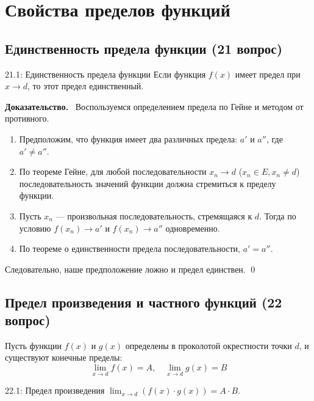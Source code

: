 \documentclass[a4paper,12pt]{article}
\newcommand{\myproof}{\textbf{Доказательство.}\ }
\begin{document}
	
	
	
	
	
	
	
	
	\newpage
	\section{Свойства пределов функций}
	
	\subsection{Единственность предела функции (21 вопрос)}
	
	\begin{theorembox}{21.1: Единственность предела функции}
		Если функция $f(x)$ имеет предел при $x \to d$, то этот предел единственный.
	\end{theorembox}
	\vspace{0.5cm}
	\myproof
	Воспользуемся определением предела по Гейне и методом от противного.
	\begin{enumerate}
		\item Предположим, что функция имеет два различных предела: $a'$ и $a''$, где $a' \neq a''$.
		\item По теореме Гейне, для любой последовательности $x_n \to d$ ($x_n \in E, x_n \neq d$) последовательность значений функции должна стремиться к пределу функции.
		\item Пусть $x_n$ — произвольная последовательность, стремящаяся к $d$. Тогда по условию $f(x_n) \to a'$ и $f(x_n) \to a''$ одновременно.
		\item По теореме о единственности предела последовательности, $a' = a''$.
	\end{enumerate}
	Следовательно, наше предположение ложно и предел единствен. \qed
	
		
	
	\vspace{1cm}
	\subsection{Предел произведения и частного функций (22 вопрос)}
	
	Пусть функции $f(x)$ и $g(x)$ определены в проколотой окрестности точки $d$, и существуют конечные пределы:
	\[ \lim_{x \to d} f(x) = A, \quad \lim_{x \to d} g(x) = B \]
	
	\begin{theorembox}{22.1: Предел произведения}
		$\lim_{x \to d} (f(x) \cdot g(x)) = A \cdot B$.
	\end{theorembox}
	
\end{document}
